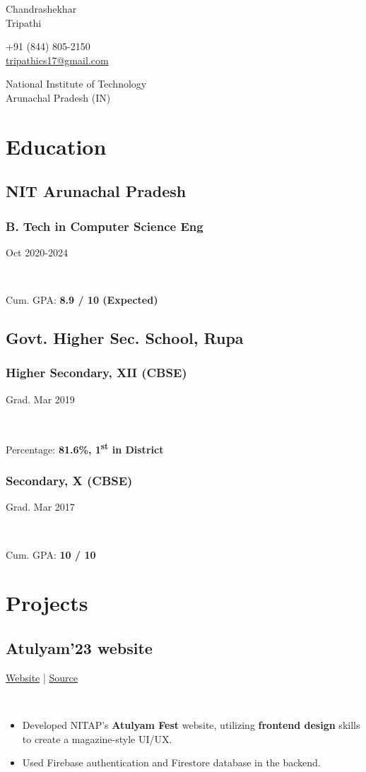 \documentclass[]{article}
\newcommand{\namesection}[3]{
  \begin{multicols}{2}
    \begin{flushleft}
      \fontsize{30pt}{25pt}
      \fontspec[Path = fonts/ZillaSlab/]{ZillaSlab-Light}
      {{ #1 }\\{ #2 }}
      \columnbreak\\
    \end{flushleft}
    \begin{flushright}
      { #3 }
    \end{flushright}
  \end{multicols}
  \vspace{-5pt}
}
\newcommand{\subheading}[2]{
  {\subsection{#1}
  \hfill{#2}}\\
  \vspace{2pt}
}
\newcommand{\subsubheading}[2]{
  {\subsubsection{#1}
  \hfill \small#2} \\
  \vspace{2pt}
}
\newenvironment{tightemize}{
\vspace{-4pt}\begin{itemize}\itemsep3pt \parskip0pt \parsep0pt}
{\end{itemize}\vspace{-\topsep}}
\begin{document}
\namesection{Chandrashekhar}{Tripathi}{+91 (844) 805-2150\\
  \href{mailto:tripathics17@gmail.com}{tripathics17@gmail.com}
  \par
  National Institute of Technology\\
  Arunachal Pradesh (IN)}

\noindent\makebox[\linewidth]{\color{light}\rule{\paperwidth}{0.2pt}}
\vspace{-8pt}

\begin{multicols}{2}
  \begin{flushleft}
    \section{Education}    
    \subsection{NIT Arunachal Pradesh}
    \subsubheading{B. Tech in Computer Science Eng}{Oct 2020-2024}
    Cum. GPA: \textbf{8.9 / 10 (Expected)}

    \subsection{Govt. Higher Sec. School, Rupa}
    \subsubheading{Higher Secondary, XII (CBSE)}{Grad. Mar 2019}
    Percentage: \textbf{81.6\%, 1\textsuperscript{st} in District}

    \subsubheading{Secondary, X (CBSE)}{Grad. Mar 2017}
    Cum. GPA: \textbf{10 / 10}
    \vspace{-8pt}

    \section{Projects}

    \subheading{Atulyam'23 website}{
      \href{https://atulyam23.com}{Website} | 
      \href{https://github.com/tripathics/atulyam-2023}{Source} 
    }
    \begin{tightemize}
      \item Developed NITAP's \textbf{Atulyam Fest} website, utilizing \textbf{frontend design} skills to create a magazine-style UI/UX.
      \item Used Firebase authentication and Firestore database in the backend.
    \end{tightemize}


\end{flushleft}
\end{multicols}
\end{document}
